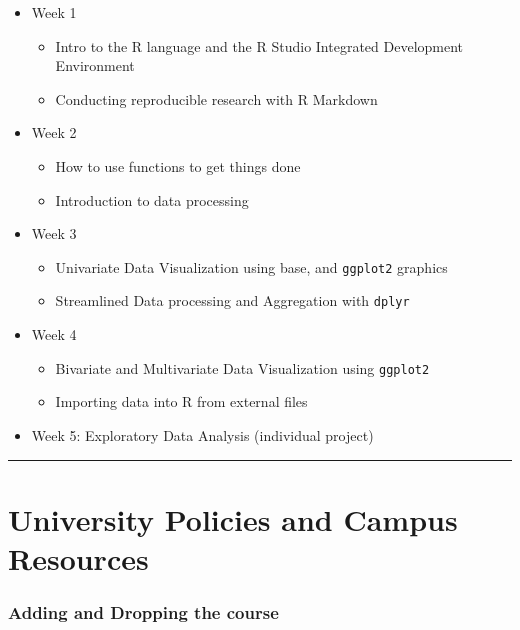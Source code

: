 \documentclass[
  11pt,
]{article}
\providecommand{\tightlist}{%
  \setlength{\itemsep}{0pt}\setlength{\parskip}{0pt}}
\begin{document}
\begin{itemize}
\tightlist
\item
  Week 1

  \begin{itemize}
  \tightlist
  \item
    Intro to the R language and the R Studio Integrated Development
    Environment
  \item
    Conducting reproducible research with R Markdown
  \end{itemize}
\item
  Week 2

  \begin{itemize}
  \tightlist
  \item
    How to use functions to get things done
  \item
    Introduction to data processing
  \end{itemize}
\item
  Week 3

  \begin{itemize}
  \tightlist
  \item
    Univariate Data Visualization using base, and \texttt{ggplot2}
    graphics
  \item
    Streamlined Data processing and Aggregation with \texttt{dplyr}
  \end{itemize}
\item
  Week 4

  \begin{itemize}
  \tightlist
  \item
    Bivariate and Multivariate Data Visualization using \texttt{ggplot2}
  \item
    Importing data into R from external files
  \end{itemize}
\item
  Week 5: Exploratory Data Analysis (individual project)
\end{itemize}

\begin{center}\rule{0.5\linewidth}{0.5pt}\end{center}

\hypertarget{university-policies-and-campus-resources}{%
\section{University Policies and Campus
Resources}\label{university-policies-and-campus-resources}}

\hypertarget{adding-and-dropping-the-course}{%
\subsubsection{Adding and Dropping the
course}\label{adding-and-dropping-the-course}}
\end{document}
